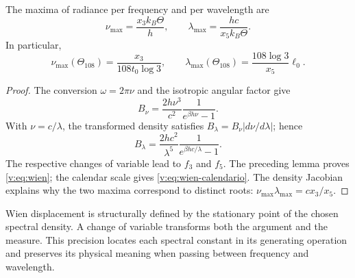 \begin{proposition}
\label{v:prop:wien}
The maxima of radiance per frequency and per wavelength are
\begin{equation}
 \nu_{\max}=\frac{x_3 k_B\Theta}{h},\qquad
 \lambda_{\max}=\frac{hc}{x_5 k_B\Theta}.
 \label{v:eq:wien}
\end{equation}
In particular,
\begin{equation}
 \nu_{\max}(\Theta_{108})=
 \frac{x_3}{108t_0\log3},\qquad
 \lambda_{\max}(\Theta_{108})=
 \frac{108\log3}{x_5}\ell_0.
 \label{v:eq:wien-calendario}
\end{equation}
\end{proposition}
\begin{proof}
The conversion \(\omega=2\pi\nu\) and the isotropic angular factor give
\[
 B_\nu=\frac{2h\nu^3}{c^2}\frac1{e^{\beta h\nu}-1}.
\]
With \(\nu=c/\lambda\), the transformed density satisfies
\(B_\lambda=B_\nu|d\nu/d\lambda|\); hence
\[
 B_\lambda=\frac{2hc^2}{\lambda^5}
 \frac1{e^{\beta hc/\lambda}-1}.
\]
The respective changes of variable lead to \(f_3\) and \(f_5\).
The preceding lemma proves \eqref{v:eq:wien}; the calendar scale
gives \eqref{v:eq:wien-calendario}. The density Jacobian explains why
the two maxima correspond to distinct roots:
\(\nu_{\max}\lambda_{\max}=c x_3/x_5\).
\end{proof}

Wien displacement is structurally defined by the stationary point of
the chosen spectral density. A change of variable transforms
both the argument and the measure. This precision locates
each spectral constant in its generating operation and preserves its
physical meaning when passing between frequency and wavelength.
